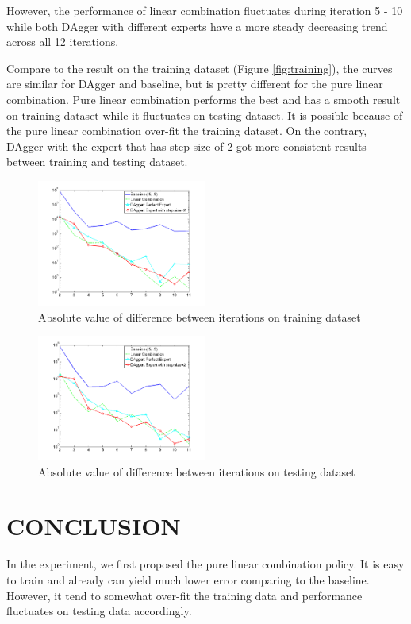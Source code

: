\documentclass[twoside]{article}
\begin{document}
However, the performance of linear combination fluctuates during iteration 5 - 10 while both DAgger with different experts have a more steady decreasing trend across all 12 iterations. 

Compare to the result on the training dataset (Figure \ref{fig:training}), the curves are similar for DAgger and baseline, but is pretty different for the pure linear combination. Pure linear combination performs the best and has a smooth result on training dataset while it fluctuates on testing dataset. It is possible because of the pure linear combination over-fit the training dataset. On the contrary, DAgger with the expert that has step size of 2 got more consistent results between training and testing dataset.


\begin{figure}[h!]
  \caption{Absolute value of difference between iterations on training dataset}
	\label{fig:converge_training}
    \includegraphics[width=210px]{convergence_Training.png}
\end{figure}

\begin{figure}[h!]

  \caption{Absolute value of difference between iterations on testing dataset}
  \label{fig:converge_testing}
    \includegraphics[width=210px]{convergence_Testing.png}
\end{figure}


\section{CONCLUSION}
In the experiment, we first proposed the pure linear combination policy. It is easy to train and already can yield much lower error comparing to the baseline. However, it tend to somewhat over-fit the training data and performance fluctuates on testing data accordingly. 
\end{document}
